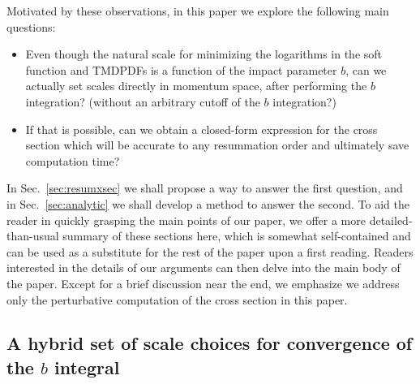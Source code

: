 \documentclass[a4,letterpaper,11pt]{article}
\renewcommand{\sec}[1]{Sec.~\ref{sec:#1}}
\begin{document}
Motivated by these observations,  in this paper we explore the following main questions:
\begin{itemize}
\item Even though the natural scale for minimizing the logarithms in the soft function and TMDPDFs is a function of the impact parameter $b$, can we actually set scales directly in momentum space, after performing the $b$ integration? (without an arbitrary cutoff of the $b$ integration?)

\item If that is possible, can we obtain a closed-form expression for the cross section which will be accurate to any resummation order and  ultimately save computation time?
\end{itemize}

In \sec{resumxsec} we shall propose a way to answer the first question, and in \sec{analytic} we shall develop a method to answer the second. To aid the reader in quickly grasping the main points of our paper, we offer a more detailed-than-usual summary of these sections here, which is somewhat self-contained and can be used as a substitute for the rest of the paper upon a first reading. Readers interested in the details of our arguments can then delve into the main body of the paper. Except for a brief discussion near the end, we emphasize we address only the perturbative computation of the cross section in this paper.

\subsection{A hybrid set of scale choices for convergence of the $b$ integral}
\end{document}
